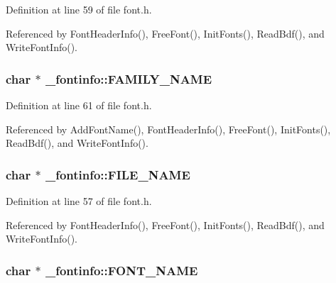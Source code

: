 Definition at line 59 of file font.\-h.



Referenced by Font\-Header\-Info(), Free\-Font(), Init\-Fonts(), Read\-Bdf(), and Write\-Font\-Info().

\hypertarget{struct__fontinfo_a4af43750caadb3ae9d7375f0afdcd171}{
\subsubsection[{F\-A\-M\-I\-L\-Y\-\_\-\-N\-A\-M\-E}]{\setlength{\rightskip}{0pt plus 5cm}char $\ast$ \-\_\-fontinfo\-::\-F\-A\-M\-I\-L\-Y\-\_\-\-N\-A\-M\-E}}\label{struct__fontinfo_a4af43750caadb3ae9d7375f0afdcd171}


Definition at line 61 of file font.\-h.



Referenced by Add\-Font\-Name(), Font\-Header\-Info(), Free\-Font(), Init\-Fonts(), Read\-Bdf(), and Write\-Font\-Info().

\hypertarget{struct__fontinfo_a86ca02a864b7dccb21004f51bea22ed3}{
\subsubsection[{F\-I\-L\-E\-\_\-\-N\-A\-M\-E}]{\setlength{\rightskip}{0pt plus 5cm}char $\ast$ \-\_\-fontinfo\-::\-F\-I\-L\-E\-\_\-\-N\-A\-M\-E}}\label{struct__fontinfo_a86ca02a864b7dccb21004f51bea22ed3}


Definition at line 57 of file font.\-h.



Referenced by Font\-Header\-Info(), Free\-Font(), Init\-Fonts(), Read\-Bdf(), and Write\-Font\-Info().

\hypertarget{struct__fontinfo_a6c0f76f2668446a1c37ecab8d4e286a5}{
\subsubsection[{F\-O\-N\-T\-\_\-\-N\-A\-M\-E}]{\setlength{\rightskip}{0pt plus 5cm}char $\ast$ \-\_\-fontinfo\-::\-F\-O\-N\-T\-\_\-\-N\-A\-M\-E}}\label{struct__fontinfo_a6c0f76f2668446a1c37ecab8d4e286a5}


